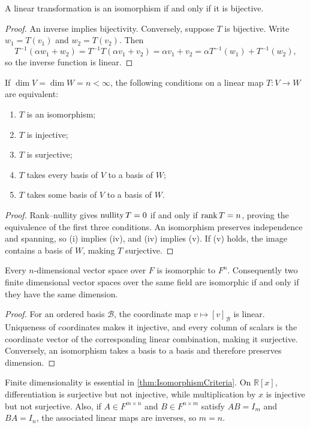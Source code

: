 \begin{Theorem}
A linear transformation is an isomorphism if and only if it is bijective.
\end{Theorem}
\begin{proof}
An inverse implies bijectivity. Conversely, suppose $T$ is bijective. Write $w_1=T(v_1)$ and $w_2=T(v_2)$. Then
\begin{equation*}
T^{-1}(\alpha w_1+w_2)=T^{-1}T(\alpha v_1+v_2)=\alpha v_1+v_2=\alpha T^{-1}(w_1)+T^{-1}(w_2),
\end{equation*}
so the inverse function is linear.
\end{proof}

\begin{Theorem}\label{thm:IsomorphismCriteria}
If $\dim V=\dim W=n<\infty$, the following conditions on a linear map $T\colon V\to W$ are equivalent:
\begin{enumerate}[label=(\roman*)]
\item $T$ is an isomorphism;
\item $T$ is injective;
\item $T$ is surjective;
\item $T$ takes every basis of $V$ to a basis of $W$;
\item $T$ takes some basis of $V$ to a basis of $W$.
\end{enumerate}
\end{Theorem}
\begin{proof}
Rank--nullity gives $\operatorname{nullity} T=0$ if and only if $\rank T=n$, proving the equivalence of the first three conditions. An isomorphism preserves independence and spanning, so (i) implies (iv), and (iv) implies (v). If (v) holds, the image contains a basis of $W$, making $T$ surjective.
\end{proof}

\begin{Theorem}
Every $n$-dimensional vector space over $F$ is isomorphic to $F^n$. Consequently two finite dimensional vector spaces over the same field are isomorphic if and only if they have the same dimension.
\end{Theorem}
\begin{proof}
For an ordered basis $\mathcal B$, the coordinate map $v\mapsto[v]_{\mathcal B}$ is linear. Uniqueness of coordinates makes it injective, and every column of scalars is the coordinate vector of the corresponding linear combination, making it surjective. Conversely, an isomorphism takes a basis to a basis and therefore preserves dimension.
\end{proof}

\begin{Remark*}
Finite dimensionality is essential in \cref{thm:IsomorphismCriteria}. On $\mathbb R[x]$, differentiation is surjective but not injective, while multiplication by $x$ is injective but not surjective. Also, if $A\in F^{m\times n}$ and $B\in F^{n\times m}$ satisfy $AB=I_m$ and $BA=I_n$, the associated linear maps are inverses, so $m=n$.
\end{Remark*}
